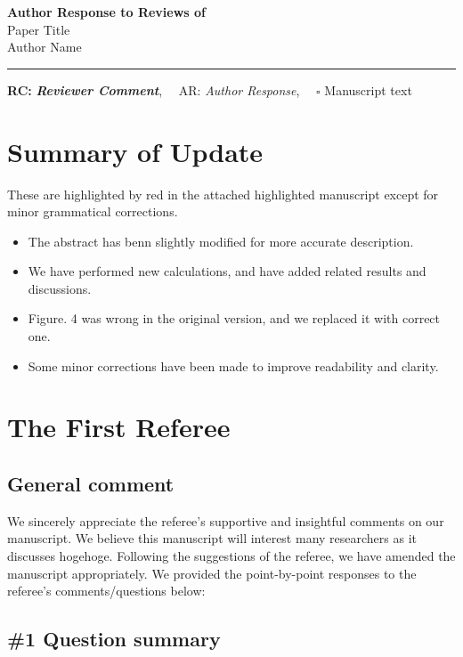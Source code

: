 \documentclass[luatex,onecolumn,showpacs,aps,preprint,prb,amsfonts,amsmath,amssymb,floatfix,groupedaddress, longbibliography]{revtex4-2}
\def\papertitle{Paper Title}
\def\authors{Author Name}
\def\journal{}
\def\doi{}
\providecommand{\lettertitle}{Author Response to Reviews of}
\providecommand{\papertitle}{Title}
\providecommand{\authors}{Authors}
\providecommand{\journal}{Journal}
\begin{document}
{\Large\bf \lettertitle}\\[1em]
{\huge \papertitle}\\[1em]
{\authors}\\
\hrule

\hfill {\bfseries RC:} \textbf{\textit{Reviewer Comment}},\(\quad\) AR: \emph{Author Response}, \(\quad\square\) Manuscript text

\section{Summary of Update}

\lipsum[1]

These are highlighted by red in the attached highlighted manuscript except for minor grammatical corrections.

\begin{itemize}
  \item The abstract has benn slightly modified for more accurate description.
  \item We have performed new calculations, and have added related results and discussions. 
  \item Figure. 4 was wrong in the original version, and we replaced it with correct one.
  \item Some minor corrections have been made to improve readability and clarity.
\end{itemize}


\section{The First Referee}

\subsection{General comment}

\RC \lipsum[1]

\AR We sincerely appreciate the referee’s supportive and insightful comments on our manuscript. We believe this manuscript will interest many researchers as it discusses hogehoge. Following the suggestions of the referee, we have amended the manuscript appropriately. We provided the point-by-point responses to the referee’s comments/questions below:

\subsection{\#1 Question summary}
\end{document}
